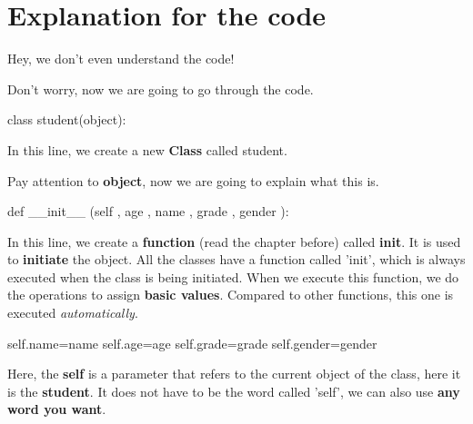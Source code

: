 \documentclass[12pt]{article}
\begin{document}
\section{Explanation for the code}
\begin{tcolorbox}[colback=blue!5!white,colframe=blue!50!white,title=Reader's Complain]
	Hey, we don't even understand the code!
\end{tcolorbox}
\par Don't worry, now we are going to go through the code.
\begin{python}
	class student(object):
\end{python}
\par In this line, we create a new \textbf{Class} called student.
\par Pay attention to \textbf{object}, now we are going to explain what this is.
\begin{python}
	def __init__ (self , age , name , grade , gender ):
\end{python}
\par In this line, we create a \textbf{function} (read the chapter before) called \textbf{init}. It is used to \textbf{initiate} the object. All the classes have a function called 'init', which is always executed when the class is being initiated. When we execute this function, we do the operations to assign \textbf{basic values}. Compared to other functions, this one is executed \textit{automatically}.
\begin{python}
  self.name=name	
	self.age=age
	self.grade=grade
	self.gender=gender
\end{python}
\par Here, the \textbf{self} is a parameter that refers to the current object of the class, here it is the \textbf{student}. It does not have to be the word called 'self', we can also use \textbf{any word you want}.
\printbibliography
\end{document}
